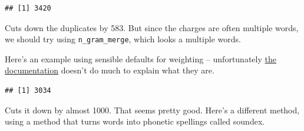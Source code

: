 \documentclass[]{book}
\newenvironment{Shaded}{\begin{snugshade}}{\end{snugshade}}
\newcommand{\DataTypeTok}[1]{\textcolor[rgb]{0.13,0.29,0.53}{#1}}
\newcommand{\DecValTok}[1]{\textcolor[rgb]{0.00,0.00,0.81}{#1}}
\newcommand{\FloatTok}[1]{\textcolor[rgb]{0.00,0.00,0.81}{#1}}
\newcommand{\KeywordTok}[1]{\textcolor[rgb]{0.13,0.29,0.53}{\textbf{#1}}}
\newcommand{\NormalTok}[1]{#1}
\newcommand{\OperatorTok}[1]{\textcolor[rgb]{0.81,0.36,0.00}{\textbf{#1}}}
\newcommand{\OtherTok}[1]{\textcolor[rgb]{0.56,0.35,0.01}{#1}}
\newcommand{\StringTok}[1]{\textcolor[rgb]{0.31,0.60,0.02}{#1}}
\begin{document}
\begin{verbatim}
## [1] 3420
\end{verbatim}

Cuts down the duplicates by 583. But since the charges are often multiple words, we should try using \texttt{n\_gram\_merge}, which looks a multiple words.

Here's an example using sensible defaults for weighting -- unfortunately \href{https://github.com/ChrisMuir/refinr}{the documentation} doesn't do much to explain what they are.

\begin{Shaded}
\end{Shaded}

\begin{verbatim}
## [1] 3034
\end{verbatim}

Cuts it down by almost 1000. That seems pretty good. Here's a different method, using a method that turns words into phonetic spellings called soundex.

\begin{Shaded}
\end{Shaded}
\end{document}
